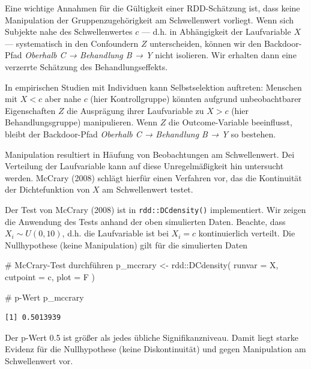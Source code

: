 \documentclass[
  a4paper,
  DIV=11,
  oneside]{scrreprt}
\newenvironment{Shaded}{\begin{snugshade}}{\end{snugshade}}
\newcommand{\AttributeTok}[1]{\textcolor[rgb]{0.40,0.45,0.13}{#1}}
\newcommand{\CommentTok}[1]{\textcolor[rgb]{0.37,0.37,0.37}{#1}}
\newcommand{\FunctionTok}[1]{\textcolor[rgb]{0.28,0.35,0.67}{#1}}
\newcommand{\NormalTok}[1]{\textcolor[rgb]{0.00,0.23,0.31}{#1}}
\newcommand{\OtherTok}[1]{\textcolor[rgb]{0.00,0.23,0.31}{#1}}
\newcommand{\SpecialCharTok}[1]{\textcolor[rgb]{0.37,0.37,0.37}{#1}}
\begin{document}
Eine wichtige Annahmen für die Gültigkeit einer RDD-Schätzung ist, dass
keine Manipulation der Gruppenzugehörigkeit am Schwellenwert vorliegt.
Wenn sich Subjekte nahe des Schwellenwertes \(c\) --- d.h. in
Abhängigkeit der Laufvariable \(X\) --- systematisch in den Confoundern
\(Z\) unterscheiden, können wir den Backdoor-Pfad \emph{Oberhalb C →
Behandlung B → Y} nicht isolieren. Wir erhalten dann eine verzerrte
Schätzung des Behandlungseffekts.

In empirischen Studien mit Individuen kann Selbstselektion auftreten:
Menschen mit \(X<c\) aber nahe \(c\) (hier Kontrollgruppe) könnten
aufgrund unbeobachtbarer Eigenschaften \(Z\) die Ausprägung ihrer
Laufvariable zu \(X>c\) (hier Behandlungsgruppe) manipulieren. Wenn
\(Z\) die Outcome-Variable beeinflusst, bleibt der Backdoor-Pfad
\emph{Oberhalb C → Behandlung B → Y} so bestehen.

Manipulation resultiert in Häufung von Beobachtungen am Schwellenwert.
Dei Verteilung der Laufvariable kann auf diese Unregelmäßigkeit hin
untersucht werden. McCrary (2008) schlägt hierfür einen Verfahren vor,
das die Kontinuität der Dichtefunktion von \(X\) am Schwellenwert
testet.

Der Test von McCrary (2008) ist in \texttt{rdd::DCdensity()}
implementiert. Wir zeigen die Anwendung des Tests anhand der oben
simulierten Daten. Beachte, dass \(X_i\sim U(0, 10)\), d.h. die
Laufvariable ist bei \(X_i = c\) kontinuierlich verteilt. Die
Nullhypothese (keine Manipulation) gilt für die simulierten Daten

\begin{Shaded}
\begin{Highlighting}[]
\CommentTok{\# McCrary{-}Test durchführen}
\NormalTok{p\_mccrary }\OtherTok{\textless{}{-}}\NormalTok{ rdd}\SpecialCharTok{::}\FunctionTok{DCdensity}\NormalTok{(}
  \AttributeTok{runvar =}\NormalTok{ X, }
  \AttributeTok{cutpoint =}\NormalTok{ c, }
  \AttributeTok{plot =}\NormalTok{ F}
\NormalTok{)}

\CommentTok{\# p{-}Wert}
\NormalTok{p\_mccrary}
\end{Highlighting}
\end{Shaded}

\begin{verbatim}
[1] 0.5013939
\end{verbatim}

Der p-Wert 0.5 ist größer als jedes übliche Signifikanzniveau. Damit
liegt starke Evidenz für die Nullhypothese (keine Diskontinuität) und
gegen Manipulation am Schwellenwert vor.
\end{document}
